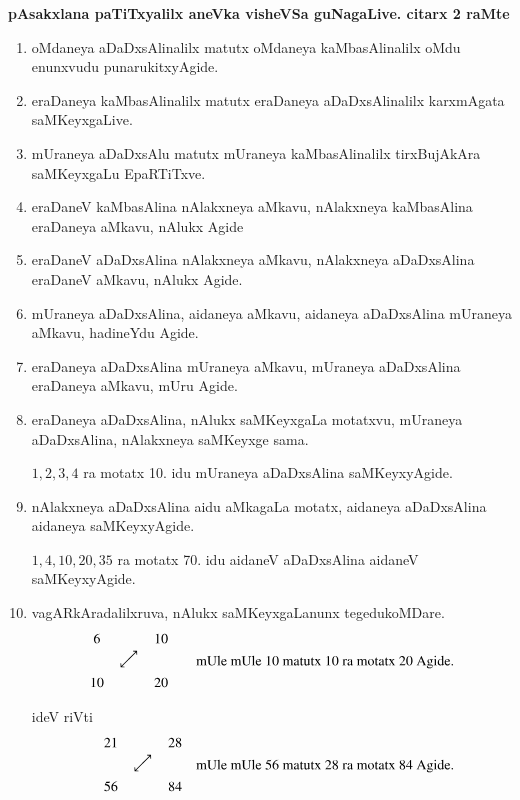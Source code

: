 \noindent
\textbf{pAsakxlana paTiTxyalilx aneVka visheVSa guNagaLive. citarx {\rm 2} raMte}
\begin{enumerate}[{\rm 1)}]
\item oMdaneya aDaDxsAlinalilx matutx oMdaneya kaMbasAlinalilx oMdu enunxvudu punarukitxyAgide.

\item eraDaneya kaMbasAlinalilx matutx eraDaneya aDaDxsAlinalilx karxmAgata saMKeyx\-gaLive.

\item mUraneya aDaDxsAlu matutx mUraneya kaMbasAlinalilx tirxBujAkAra saMKeyxgaLu EpaRTiTxve.

\item eraDaneV kaMbasAlina nAlakxneya aMkavu, nAlakxneya kaMbasAlina eraDaneya aMkavu, nAlukx Agide

\item eraDaneV aDaDxsAlina nAlakxneya aMkavu, nAlakxneya aDaDxsAlina eraDaneV aMkavu, nAlukx Agide.

\item mUraneya aDaDxsAlina, aidaneya aMkavu, aidaneya aDaDxsAlina mUraneya aMkavu, hadineYdu Agide.

\item eraDaneya aDaDxsAlina mUraneya aMkavu, mUraneya aDaDxsAlina eraDaneya aMkavu, mUru Agide.

\item eraDaneya aDaDxsAlina, nAlukx saMKeyxgaLa motatxvu, mUraneya aDaDxsAlina, nAlakxneya saMKeyxge sama.

$1, 2, 3, 4$ ra motatx {\rm 10}. idu mUraneya aDaDxsAlina saMKeyxyAgide.

\item nAlakxneya aDaDxsAlina aidu aMkagaLa motatx, aidaneya aDaDxsAlina aidaneya saMKeyxyAgide.

$1, 4, 10, 20, 35$ ra motatx {\rm 70}. idu aidaneV aDaDxsAlina aidaneV saMKeyxyAgide.

\item  vagARkAradalilxruva, nAlukx saMKeyxgaLanunx tegedukoMDare. 
$$
\begin{matrix}
6 && 10\\
& \rotatebox{45}{$\longleftrightarrow $} & \\
10 && 20
\end{matrix}
\qquad \text{mUle mUle {\rm 10} matutx {\rm 10} ra motatx {\rm 20} Agide.}
$$

ideV riVti
$$
\begin{matrix}
 & 21 && 28\\
&& \rotatebox{45}{$\longleftrightarrow $} & \\
& 56 && 84
\end{matrix}
\quad \text{mUle mUle {\rm 56} matutx {\rm 28} ra motatx {\rm 84}}\\[-0.55cm]
\text{~Agide.}
$$


\end{enumerate}
